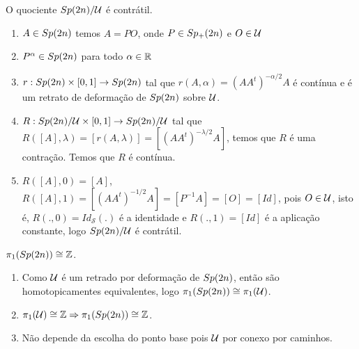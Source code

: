 \documentclass{beamer}
\begin{document}
	\begin{frame}
		
		\begin{teorema}
			O quociente $Sp(2n)/\mathcal{U}$ é contrátil.
		\end{teorema}
		\begin{prova}
			
			\begin{enumerate}
				\item $A \in Sp(2n)$ temos $A=PO$, onde $P \in Sp_{+}(2n)$ e $O \in \mathcal{U}$
				
				\pause
				\item $P^{\alpha} \in Sp(2n)$ para todo $\alpha \in \mathbb{R}^{}$
				
				\pause
				\item $r:Sp(2n)\times [0,1] \to Sp(2n)$ tal que $r(A, \alpha) = (AA^{t})^{-\alpha/2}A$ é contínua e é um retrato de deformação de $Sp(2n)$ sobre $\mathcal{U}$.
				
				\pause
				\item $R:Sp(2n)/\mathcal{U} \times [0,1] \to Sp(2n)/\mathcal{U}$ tal que $R([A], \lambda) = [r(A, \lambda)] = [(AA^{t})^{-\lambda/2}A]$, temos que $R$ é uma contração. Temos que $R$ é contínua.
				
				\pause
				\item $R([A], 0) = [A]$, $R([A], 1) = [(AA^{t})^{-1/2}A] = [P^{-1}A] = [O] = [Id]$, pois $O \in \mathcal{U}$, isto é, $R(., 0) = Id_{\mathcal{S}}(.)$ é a identidade e $R(., 1) = [Id]$ é a aplicação constante, logo $Sp(2n)/\mathcal{U} $ é contrátil.
			\end{enumerate}
		\end{prova}
	\end{frame}
	
	\begin{frame}
		
		\begin{teorema}
			$\pi_{1}(Sp(2n)) \cong \mathbb{Z}$.
		\end{teorema}
		\begin{prova}
			\begin{enumerate}
				\item Como $\mathcal{U}$ é um retrado por deformação de $Sp(2n)$, então são homotopicamentes equivalentes, logo $\pi_{1}(Sp(2n)) \cong \pi_{1}(\mathcal{U})$.
				
				\pause
				\item $\pi_{1}(\mathcal{U}) \cong \mathbb{Z} \Rightarrow \pi_{1}(Sp(2n)) \cong \mathbb{Z}$.
				
				\pause
				\item Não depende da escolha do ponto base pois $\mathcal{U}$ por conexo por caminhos.
			\end{enumerate}
		\end{prova}
	\end{frame}
	
\end{document}
